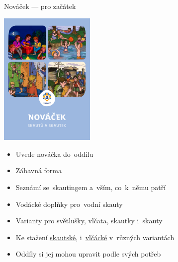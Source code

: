 \documentclass[compress, ucs, xelatex, 11pt, xcolor=dvipsnames, print, aspectratio=169,
	hyperref={
		bookmarks=true,
		unicode=true,
		colorlinks=true,
		pdftitle={Skautska vychovna metoda},
		plainpages=false,
		pdfauthor={Vojtech Zeisek},
		pdfsubject={Skautska vychovna metoda a jeji vyvoj za posledni stoleti a desetileti},
		pdfcreator={XeLaTeX},
		pdfkeywords={Junak, Pedagogika, Skaut, Skauting, Vychovna metoda},
		linkcolor=Red, %
		anchorcolor=ForestGreen, %
		citecolor=ForestGreen, %
		filecolor=ForestGreen, %
		menucolor=ForestGreen, %
		urlcolor=Sepia, %
		pdftex},
	url={hyphens, lowtilde} %
	]{beamer}
\begin{document}
\begin{frame}{Nováček --- pro začátek}
	\begin{multicols}{2}
		\includegraphics[height=6.5cm]{novacek.png}
		\columnbreak
		\begin{itemize}
			\item Uvede nováčka do~oddílu
			\item Zábavná forma
			\item Seznámí se~skautingem a~vším, co~k~němu patří
			\item Vodácké doplňky pro~vodní skauty
			\item Varianty pro světlušky, vlčata, skautky i~skauty
			\item Ke stažení \href{https://stezka.skaut.cz/novacek/}{skautské}, i~\href{https://krizovatka.skaut.cz/oddil/program/svetlusky-a-vlcata/vlcata-svetlusky-stezky/kouzelna-lucerna/novacek}{vlčácké} v~různých variantách
			\item Oddíly si jej mohou upravit podle svých potřeb
		\end{itemize}
	\end{multicols}
\end{frame}
\end{document}
